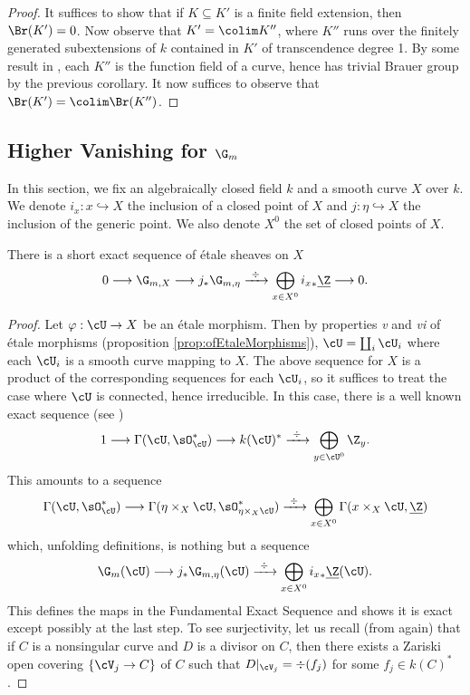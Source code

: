 \begin{proof}
It suffices to show that if $K \subseteq K'$ is a finite field extension, then $\Br(K') = 0$. Now observe that $K' = \colim K''$, where $K''$ runs over the finitely generated subextensions of $k$ contained in $K'$ of transcendence degree 1. By some result in \cite{Hartshorne}, each $K''$ is the function field of a curve, hence has trivial Brauer group by the previous  corollary. It now suffices to observe that $\Br(K') = \colim \Br(K'')$.
\end{proof}

\subsection{Higher Vanishing for $\G_m$}

In this section, we fix an algebraically closed field $k$ and a smooth curve $X$ over $k$. We denote $i_x : x \hookrightarrow X$ the inclusion of a closed point of $X$ and $j : \eta \hookrightarrow X$ the inclusion of the generic point. We also denote $X^0$ the set of closed points of $X$. 

\begin{thm}
There is a short exact sequence of \'etale sheaves on $X$
$$
0 \longrightarrow \G_{m,X} \longrightarrow j_* \G_{m,\eta} \xrightarrow{\ \div\ } \bigoplus_{x \in X^0} {i_x}_* \underline{\Z} \longrightarrow 0.
$$
\end{thm}

\begin{proof}
Let $\varphi : \cU \to X$ be an \'etale morphism. Then by properties {\it v} and {\it vi} of \'etale morphisms (proposition \ref{prop:ofEtaleMorphisms}), $\cU = \coprod_i \cU_i$ where each $\cU_i$ is a smooth curve mapping to $X$. The above sequence for $X$ is a product of the corresponding sequences for each $\cU_i$, so it suffices to treat the case where $\cU$ is connected, hence irreducible. In this case, there is a well known exact sequence (see \cite{Hartshorne})
$$
1 \longrightarrow \Gamma(\cU,\sO_\cU^*) \longrightarrow k(\cU)^* \xrightarrow{\ \div\ } \bigoplus_{y \in \cU^0} \Z_y.
$$
This amounts to a sequence
$$
\Gamma(\cU,\sO_\cU^*) \longrightarrow \Gamma(\eta\times_X\cU,\sO_{\eta\times_X\cU}^*) \xrightarrow{\ \div\ } \bigoplus_{x \in X^0} \Gamma(x\times_X\cU,\underline{\Z}) 
$$
which, unfolding definitions, is nothing but a sequence
$$
\G_m(\cU) \longrightarrow j_* \G_{m,\eta}(\cU) \xrightarrow{\ \div\ } \bigoplus_{x \in X^0} {i_x}_* \underline{\Z} (\cU).
$$
This defines the maps in the Fundamental Exact Sequence and shows it is exact except possibly at the last step. To see surjectivity, let us recall (from \cite{Hartshorne} again) that if $C$ is a nonsingular curve and $D$ is a divisor on $C$, then there exists a Zariski open covering $\{ \cV_j \to C \}$ of $C$ such that $D |_{\cV_j} = \div(f_j)$ for some $f_j \in k(C)^*$.
\end{proof}

